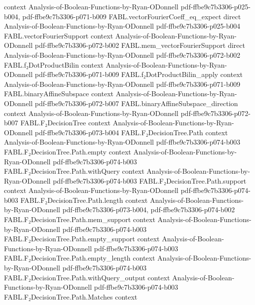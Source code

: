 \begin{theorem}
  {context}
  {Analysis-of-Boolean-Functions-by-Ryan-ODonnell}
  {pdf-ffbe9c7b3306-p025-b004,
    pdf-ffbe9c7b3306-p071-b009}
\proofstep
  {FABL.vectorFourierCoeff_eq_expect}
  {direct}
  {Analysis-of-Boolean-Functions-by-Ryan-ODonnell}
  {pdf-ffbe9c7b3306-p025-b004}
\proofstep
  {FABL.vectorFourierSupport}
  {context}
  {Analysis-of-Boolean-Functions-by-Ryan-ODonnell}
  {pdf-ffbe9c7b3306-p072-b002}
\proofstep
  {FABL.mem_vectorFourierSupport}
  {direct}
  {Analysis-of-Boolean-Functions-by-Ryan-ODonnell}
  {pdf-ffbe9c7b3306-p072-b002}
\proofstep
  {FABL.f₂DotProductBilin}
  {context}
  {Analysis-of-Boolean-Functions-by-Ryan-ODonnell}
  {pdf-ffbe9c7b3306-p071-b009}
\proofstep
  {FABL.f₂DotProductBilin_apply}
  {context}
  {Analysis-of-Boolean-Functions-by-Ryan-ODonnell}
  {pdf-ffbe9c7b3306-p071-b009}
\proofstep
  {FABL.binaryAffineSubspace}
  {context}
  {Analysis-of-Boolean-Functions-by-Ryan-ODonnell}
  {pdf-ffbe9c7b3306-p072-b007}
\proofstep
  {FABL.binaryAffineSubspace_direction}
  {context}
  {Analysis-of-Boolean-Functions-by-Ryan-ODonnell}
  {pdf-ffbe9c7b3306-p072-b007}
\proofstep
  {FABL.F₂DecisionTree}
  {context}
  {Analysis-of-Boolean-Functions-by-Ryan-ODonnell}
  {pdf-ffbe9c7b3306-p073-b004}
\proofstep
  {FABL.F₂DecisionTree.Path}
  {context}
  {Analysis-of-Boolean-Functions-by-Ryan-ODonnell}
  {pdf-ffbe9c7b3306-p074-b003}
\proofstep
  {FABL.F₂DecisionTree.Path.empty}
  {context}
  {Analysis-of-Boolean-Functions-by-Ryan-ODonnell}
  {pdf-ffbe9c7b3306-p074-b003}
\proofstep
  {FABL.F₂DecisionTree.Path.withQuery}
  {context}
  {Analysis-of-Boolean-Functions-by-Ryan-ODonnell}
  {pdf-ffbe9c7b3306-p074-b003}
\proofstep
  {FABL.F₂DecisionTree.Path.support}
  {context}
  {Analysis-of-Boolean-Functions-by-Ryan-ODonnell}
  {pdf-ffbe9c7b3306-p074-b003}
\proofstep
  {FABL.F₂DecisionTree.Path.length}
  {context}
  {Analysis-of-Boolean-Functions-by-Ryan-ODonnell}
  {pdf-ffbe9c7b3306-p073-b004,
    pdf-ffbe9c7b3306-p074-b002}
\proofstep
  {FABL.F₂DecisionTree.Path.mem_support}
  {context}
  {Analysis-of-Boolean-Functions-by-Ryan-ODonnell}
  {pdf-ffbe9c7b3306-p074-b003}
\proofstep
  {FABL.F₂DecisionTree.Path.empty_support}
  {context}
  {Analysis-of-Boolean-Functions-by-Ryan-ODonnell}
  {pdf-ffbe9c7b3306-p074-b003}
\proofstep
  {FABL.F₂DecisionTree.Path.empty_length}
  {context}
  {Analysis-of-Boolean-Functions-by-Ryan-ODonnell}
  {pdf-ffbe9c7b3306-p074-b003}
\proofstep
  {FABL.F₂DecisionTree.Path.withQuery_output}
  {context}
  {Analysis-of-Boolean-Functions-by-Ryan-ODonnell}
  {pdf-ffbe9c7b3306-p074-b003}
\proofstep
  {FABL.F₂DecisionTree.Path.Matches}
  {context}

\end{theorem}
